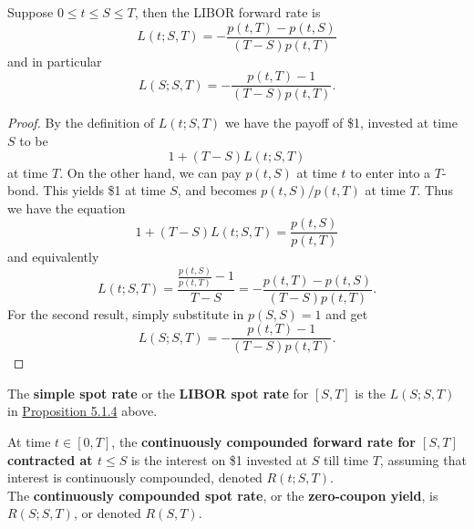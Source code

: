 \documentclass[11pt,fleqn]{book} %
\begin{document}
\begin{proposition} \label{proposition:514}
Suppose \(0 \leq t \leq S \leq T\), then the LIBOR forward rate is
\[
L(t; S, T) = -\frac{p(t, T) - p(t, S)}{(T - S)p(t, T)}
\]
and in particular
\[
L(S; S, T) = -\frac{p(t, T) - 1}{(T - S)p(t, T)}.
\]
\end{proposition}
\begin{proof}
By the definition of \(L(t; S, T)\) we have the payoff of \$1, invested at time \(S\) to be
\[
1 + (T - S)L(t; S, T)
\]
at time \(T\). On the other hand, we can pay \(p(t, S)\) at time \(t\) to enter into a \(T\)-bond. This yields \$1 at time \(S\), and becomes \(p(t, S) / p(t, T)\) at time \(T\). Thus we have the equation
\[
1 + (T - S)L(t; S, T) = \frac{p(t, S)}{p(t, T)}
\]
and equivalently
\[
L(t; S, T) = \frac{\frac{p(t, S)}{p(t, T)} - 1}{T - S} = -\frac{p(t, T) - p(t, S)}{(T - S)p(t, T)}.
\]
\indent For the second result, simply substitute in \(p(S, S) = 1\) and get
\[
L(S; S, T) = -\frac{p(t, T) - 1}{(T - S)p(t, T)}.
\]
\end{proof}

\begin{definition} \label{def:515}
The \textbf{simple spot rate} or the \textbf{LIBOR spot rate} for \([S, T]\) is the \(L(S; S, T)\) in \hyperref[prop:514]{Proposition 5.1.4} above.
\end{definition}

\begin{definition} \label{prop:516}
At time \(t \in [0, T]\), the \textbf{continuously compounded forward rate for \([S, T]\) contracted at \(t \leq S\)} is the interest on \$1 invested at \(S\) till time \(T\), assuming that interest is continuously compounded, denoted \(R(t; S, T)\). \\
\indent The \textbf{continuously compounded spot rate}, or the \textbf{zero-coupon yield}, is \(R(S; S, T)\), or denoted \(R(S, T)\).
\end{definition}
\end{document}
